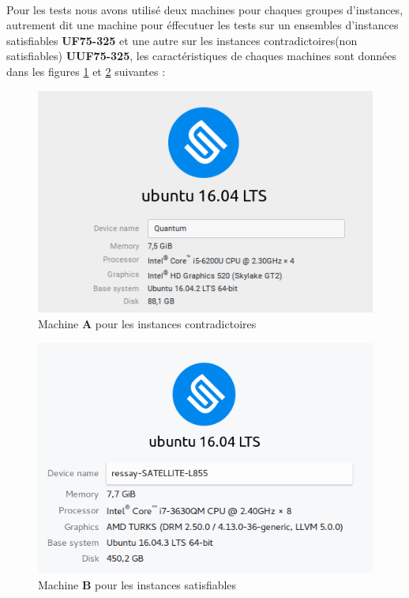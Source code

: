 \documentclass[12pt]{report}
\begin{document}
\paragraph{}
Pour les tests nous avons utilisé deux machines pour chaques groupes d'instances, autrement dit une machine pour éffecutuer les tests sur un ensembles d'instances satisfiables \textbf{UF75-325}\cite{Benchmark} et une autre sur les instances contradictoires(non satisfiables) \textbf{UUF75-325}\cite{Benchmark}, les caractéristiques de chaques machines sont données dans les figures \ref{fig:machineA} et \ref{fig:machineB} suivantes : 
\begin{figure}[H]
	\centering
	\includegraphics[scale=0.75]{images/machineWISS.png}
	\caption{Machine \textbf{A} pour les instances contradictoires}
	\label{fig:machineA}
\end{figure}
\begin{figure}[H]
	\centering
	\includegraphics[scale=0.665]{images/machineYASSER.png}
	\caption{Machine \textbf{B} pour les instances satisfiables}
	\label{fig:machineB}
\end{figure}
\newpage
\end{document}
